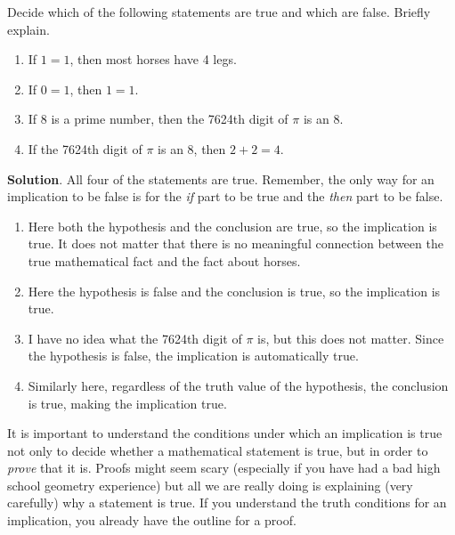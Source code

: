 \documentclass[11pt,]{book}
\theoremstyle{ptxplainnotitle}
\theoremstyle{ptxplaintitle}
\theoremstyle{ptxdefinitionnotitle}
\theoremstyle{ptxdefinitiontitle}
\theoremstyle{ptxdefinitionnotitle}
\theoremstyle{ptxdefinitiontitle}
\theoremstyle{ptxdefinitionnotitle}
\theoremstyle{ptxdefinitiontitle}
\theoremstyle{ptxdefinitiontitlenonumber}
\theoremstyle{ptxdefinitiontitlenonumber}
\numberwithin{equation}{chapter}
\begin{document}
\begin{example}\label{example-49}
\hypertarget{p-1701}{}%
Decide which of the following statements are true and which are false. Briefly explain. \leavevmode%
\begin{enumerate}
\item\hypertarget{li-720}{}\hypertarget{p-1702}{}%
If \(1=1\), then most horses have 4 legs.%
\item\hypertarget{li-721}{}\hypertarget{p-1703}{}%
If \(0=1\), then \(1=1\).%
\item\hypertarget{li-722}{}\hypertarget{p-1704}{}%
If 8 is a prime number, then the 7624th digit of \(\pi\) is an 8.%
\item\hypertarget{li-723}{}\hypertarget{p-1705}{}%
If the 7624th digit of \(\pi\) is an 8, then \(2+2 = 4\).%
\end{enumerate}
%
\par\smallskip%
\noindent\textbf{Solution}.\hypertarget{solution-195}{}\quad%
\hypertarget{p-1706}{}%
All four of the statements are true. Remember, the only way for an implication to be false is for the \emph{if} part to be true and the \emph{then} part to be false. \leavevmode%
\begin{enumerate}
\item\hypertarget{li-724}{}\hypertarget{p-1707}{}%
Here both the hypothesis and the conclusion are true, so the implication is true. It does not matter that there is no meaningful connection between the true mathematical fact and the fact about horses.%
\item\hypertarget{li-725}{}\hypertarget{p-1708}{}%
Here the hypothesis is false and the conclusion is true, so the implication is true.%
\item\hypertarget{li-726}{}\hypertarget{p-1709}{}%
I have no idea what the 7624th digit of \(\pi\) is, but this does not matter. Since the hypothesis is false, the implication is automatically true.%
\item\hypertarget{li-727}{}\hypertarget{p-1710}{}%
Similarly here, regardless of the truth value of the hypothesis, the conclusion is true, making the implication true.%
\end{enumerate}
%
\end{example}
\hypertarget{p-1711}{}%
It is important to understand the conditions under which an implication is true not only to decide whether a mathematical statement is true, but in order to \emph{prove} that it is. Proofs might seem scary (especially if you have had a bad high school geometry experience) but all we are really doing is explaining (very carefully) why a statement is true. If you understand the truth conditions for an implication, you already have the outline for a proof.%
\end{document}
